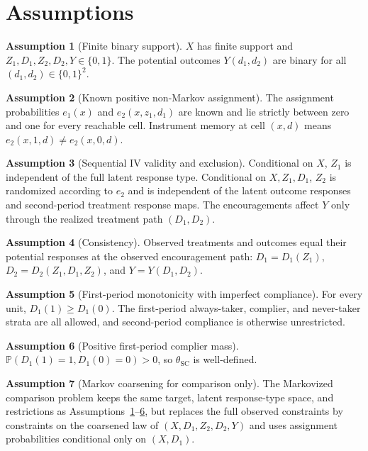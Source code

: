 \documentclass[11pt]{article}
\renewcommand{\Pr}{\mathbb{P}}
\theoremstyle{definition}
\newtheorem{assumption}{Assumption}
\theoremstyle{plain}
\theoremstyle{remark}
\begin{document}
\section{Assumptions}
\label{sec:assumptions}
\begin{assumption}[Finite binary support]\label{ass:finite}
\(X\) has finite support and \(Z_1,D_1,Z_2,D_2,Y\in\{0,1\}\).  The potential outcomes \(Y(d_1,d_2)\) are binary for all \((d_1,d_2)\in\{0,1\}^2\).
\end{assumption}

\begin{assumption}[Known positive non-Markov assignment]\label{ass:assignment}
The assignment probabilities \(e_1(x)\) and \(e_2(x,z_1,d_1)\) are known and lie strictly between zero and one for every reachable cell.  Instrument memory at cell \((x,d)\) means \(e_2(x,1,d)\ne e_2(x,0,d)\).
\end{assumption}

\begin{assumption}[Sequential IV validity and exclusion]\label{ass:seqiv}
Conditional on \(X\), \(Z_1\) is independent of the full latent response type.  Conditional on \(X,Z_1,D_1\), \(Z_2\) is randomized according to \(e_2\) and is independent of the latent outcome responses and second-period treatment response maps.  The encouragements affect \(Y\) only through the realized treatment path \((D_1,D_2)\).
\end{assumption}

\begin{assumption}[Consistency]\label{ass:consistency}
Observed treatments and outcomes equal their potential responses at the observed encouragement path: \(D_1=D_1(Z_1)\), \(D_2=D_2(Z_1,D_1,Z_2)\), and \(Y=Y(D_1,D_2)\).
\end{assumption}

\begin{assumption}[First-period monotonicity with imperfect compliance]\label{ass:mono1}
For every unit, \(D_1(1)\ge D_1(0)\).  The first-period always-taker, complier, and never-taker strata are all allowed, and second-period compliance is otherwise unrestricted.
\end{assumption}

\begin{assumption}[Positive first-period complier mass]\label{ass:poscomp}
\(\Pr(D_1(1)=1,D_1(0)=0)>0\), so \(\theta_{\mathrm{SC}}\) is well-defined.
\end{assumption}

\begin{assumption}[Markov coarsening for comparison only]\label{ass:markovcoarse}
The Markovized comparison problem keeps the same target, latent response-type space, and restrictions as Assumptions~\ref{ass:finite}--\ref{ass:poscomp}, but replaces the full observed constraints by constraints on the coarsened law of \((X,D_1,Z_2,D_2,Y)\) and uses assignment probabilities conditional only on \((X,D_1)\).
\end{assumption}
\end{document}
